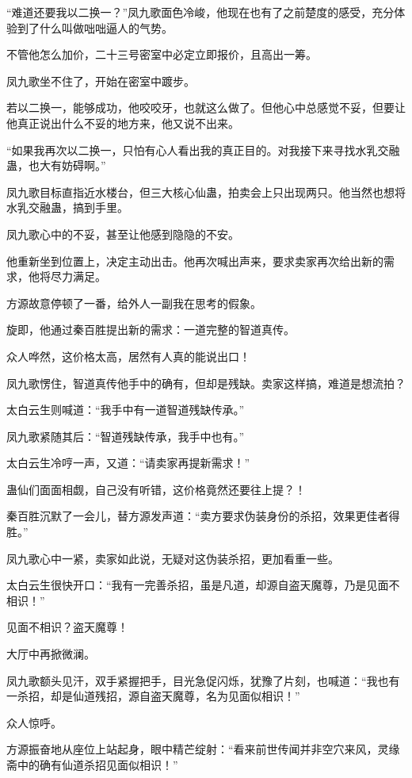 \begin{this_body}
“难道还要我以二换一？”凤九歌面色冷峻，他现在也有了之前楚度的感受，充分体验到了什么叫做咄咄逼人的气势。

不管他怎么加价，二十三号密室中必定立即报价，且高出一筹。

凤九歌坐不住了，开始在密室中踱步。

若以二换一，能够成功，他咬咬牙，也就这么做了。但他心中总感觉不妥，但要让他真正说出什么不妥的地方来，他又说不出来。

“如果我再次以二换一，只怕有心人看出我的真正目的。对我接下来寻找水乳交融蛊，也大有妨碍啊。”

凤九歌目标直指近水楼台，但三大核心仙蛊，拍卖会上只出现两只。他当然也想将水乳交融蛊，搞到手里。

凤九歌心中的不妥，甚至让他感到隐隐的不安。

他重新坐到位置上，决定主动出击。他再次喊出声来，要求卖家再次给出新的需求，他将尽力满足。

方源故意停顿了一番，给外人一副我在思考的假象。

旋即，他通过秦百胜提出新的需求：一道完整的智道真传。

众人哗然，这价格太高，居然有人真的能说出口！

凤九歌愣住，智道真传他手中的确有，但却是残缺。卖家这样搞，难道是想流拍？

太白云生则喊道：“我手中有一道智道残缺传承。”

凤九歌紧随其后：“智道残缺传承，我手中也有。”

太白云生冷哼一声，又道：“请卖家再提新需求！”

蛊仙们面面相觑，自己没有听错，这价格竟然还要往上提？！

秦百胜沉默了一会儿，替方源发声道：“卖方要求伪装身份的杀招，效果更佳者得胜。”

凤九歌心中一紧，卖家如此说，无疑对这伪装杀招，更加看重一些。

太白云生很快开口：“我有一完善杀招，虽是凡道，却源自盗天魔尊，乃是见面不相识！”

见面不相识？盗天魔尊！

大厅中再掀微澜。

凤九歌额头见汗，双手紧握把手，目光急促闪烁，犹豫了片刻，也喊道：“我也有一杀招，却是仙道残招，源自盗天魔尊，名为见面似相识！”

众人惊呼。

方源振奋地从座位上站起身，眼中精芒绽射：“看来前世传闻并非空穴来风，灵缘斋中的确有仙道杀招见面似相识！”


\end{this_body}
